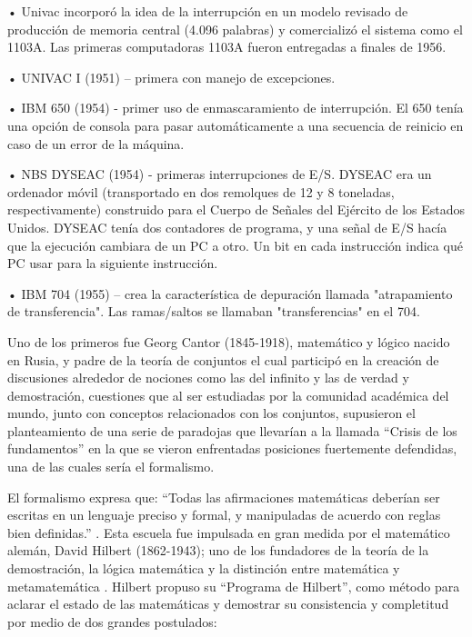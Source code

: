 \documentclass[12pt]{article}
\begin{document}
{•	Univac incorporó la idea de la interrupción en un modelo revisado de producción de memoria central (4.096 palabras) y comercializó el sistema como el 1103A. Las primeras computadoras 1103A fueron entregadas a finales de 1956.

•	UNIVAC I (1951) – primera con manejo de excepciones.

•	IBM 650 (1954) - primer uso de enmascaramiento de interrupción. El 650 tenía una opción de consola para pasar automáticamente a una secuencia de reinicio en caso de un error de la máquina.

•	NBS DYSEAC (1954) - primeras interrupciones de E/S. DYSEAC era un ordenador móvil (transportado en dos remolques de 12 y 8 toneladas, respectivamente) construido para el Cuerpo de Señales del Ejército de los Estados Unidos. DYSEAC tenía dos contadores de programa, y una señal de E/S hacía que la ejecución cambiara de un PC a otro. Un bit en cada instrucción indica qué PC usar para la siguiente instrucción.

•	IBM 704 (1955) – crea la característica de depuración llamada "atrapamiento de transferencia". Las ramas/saltos se llamaban "transferencias" en el 704.
\newline

Uno de los primeros fue Georg Cantor (1845-1918), matemático y lógico nacido en Rusia, y padre de la teoría de conjuntos \citep{CantorWiki} el cual participó en la creación de discusiones alrededor de nociones como las del infinito y las de verdad y demostración, cuestiones que al ser estudiadas por la comunidad académica del mundo, junto con conceptos relacionados con los conjuntos, supusieron el planteamiento de una serie de  paradojas que llevarían a la llamada “Crisis de los fundamentos” en la que se vieron enfrentadas posiciones fuertemente defendidas, una de las cuales sería el formalismo.
\newline

El formalismo expresa que: “Todas las afirmaciones matemáticas deberían ser escritas en un lenguaje preciso y formal, y manipuladas de acuerdo con reglas bien definidas.” \citep{AndresAbeliuk}. Esta escuela fue impulsada en gran medida por el matemático alemán, David Hilbert (1862-1943); uno de los fundadores de la teoría de la demostración, la lógica matemática y la distinción entre matemática y metamatemática \citep{HilbertWiki}. Hilbert propuso su “Programa de Hilbert”, como método para aclarar el estado de las matemáticas y demostrar su consistencia y completitud por medio de dos grandes postulados: 
\newline

}
\end{document}
